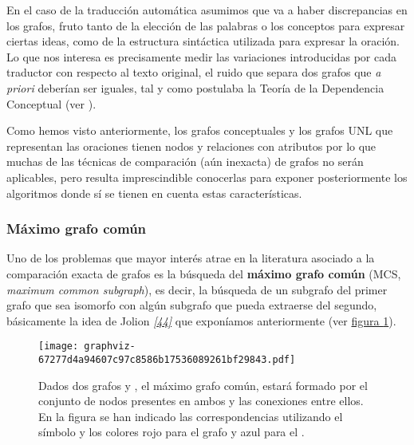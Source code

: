 \documentclass[a4paper,12pt,spanish]{book}
\begin{document}
En el caso de la traducción automática asumimos que va a haber discrepancias en los grafos,
fruto tanto de la elección de las palabras o los conceptos para expresar ciertas ideas,
como de la estructura sintáctica utilizada para expresar la oración. Lo que nos interesa
es precisamente medir las variaciones introducidas por cada traductor con respecto al
texto original, el ruido que separa dos grafos que \emph{a priori} deberían ser iguales, tal y
como postulaba la Teoría de la Dependencia Conceptual
(ver {\hyperref[1.state-of-the-art/i.representacion-conocimiento:teoria-dependencia-conceptual]{\emph{}}}).

Como hemos visto anteriormente, los grafos conceptuales y los grafos UNL que representan
las oraciones tienen nodos y relaciones con atributos por lo que muchas de las técnicas
de comparación (aún inexacta) de grafos no serán aplicables, pero resulta imprescindible
conocerlas para exponer posteriormente los algoritmos donde sí se tienen en cuenta estas
características.


\subsubsection{Máximo grafo común}
\label{1.state-of-the-art/ii.medidas-distancia:id3}\label{1.state-of-the-art/ii.medidas-distancia:maximo-grafo-comun}
Uno de los problemas que mayor interés atrae en la literatura asociado a la comparación
exacta de grafos es la búsqueda del \textbf{máximo grafo común} (MCS, \emph{maximum common subgraph}),
es decir, la búsqueda de un subgrafo del primer grafo que sea isomorfo con algún subgrafo
que pueda extraerse del segundo, básicamente la idea de Jolion \label{1.state-of-the-art/ii.medidas-distancia:id4}{\hyperref[zreferences:jolion2001]{\emph{{[}44{]}}}} que
exponíamos anteriormente (ver \hyperref[1.state-of-the-art/ii.medidas-distancia:fig-mcs-example]{figura  \ref*{1.state-of-the-art/ii.medidas-distancia:fig-mcs-example}}).
\begin{figure}[htbp]
\centering
\capstart

\texttt{[image: graphviz-67277d4a94607c97c8586b17536089261bf29843.pdf]}
\caption[Cálculo del máximo grafo común.]{Dados dos grafos  y , el máximo grafo común,  estará formado por el conjunto de nodos presentes en ambos y las conexiones entre ellos. En la figura se han indicado las correspondencias utilizando el símbolo  y los colores rojo para el grafo  y azul para el .}\label{1.state-of-the-art/ii.medidas-distancia:fig-mcs-example}\end{figure}
\end{document}

